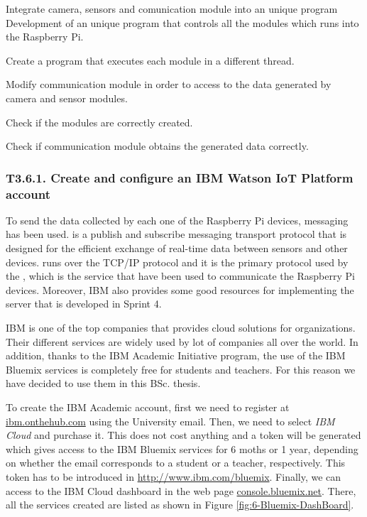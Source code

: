 {Integrate camera, sensors and comunication module into an unique program}
{Development of an unique program that controls all the modules which runs into the Raspberry Pi.}
{	\item Create a program that executes each module in a different thread.
	\item Modify communication module in order to access to the data generated by camera and sensor modules.
}{	\item Check if the modules are correctly created.
	\item Check if communication module obtains the generated data correctly.
}

\subsubsection{T3.6.1. Create and configure an IBM Watson IoT Platform account}

To send the data collected by each one of the Raspberry Pi devices,  messaging has been used.  is a publish and subscribe messaging transport protocol that is designed for the efficient exchange of real-time data between sensors and other devices.  runs over the TCP/IP protocol and it is the primary protocol used by the , which is the service that have been used to communicate the Raspberry Pi devices. Moreover, IBM also provides some good resources for implementing the server that is developed in Sprint 4. 

IBM is one of the top companies that provides cloud solutions for organizations. Their different services are widely used by lot of companies all over the world. In addition, thanks to the IBM Academic Initiative program, the use of the IBM Bluemix services is completely free for students and teachers. For this reason we have decided to use them in this \ac{BSc.} thesis.

To create the IBM Academic account, first we need to register at \url{ibm.onthehub.com} using the University email. Then, we need to select \emph{IBM Cloud} and purchase it. This does not cost anything and a token will be generated which gives access to the IBM Bluemix services for 6 moths or 1 year, depending on whether the email corresponds to a student or a teacher, respectively. This token has to be introduced in \url{http://www.ibm.com/bluemix}. Finally, we can access to the IBM Cloud dashboard in the web page \url{console.bluemix.net}. There, all the services created are listed as shown in Figure \ref{fig:6-Bluemix-DashBoard}. 

